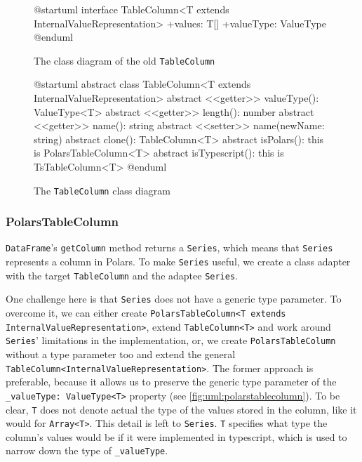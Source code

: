 \begin{figure}
	\begin{plantuml}
		@startuml
		interface TableColumn<T extends InternalValueRepresentation>{
				+values: T[]
				+valueType: ValueType
			}
		@enduml
	\end{plantuml}
	\caption{The class diagram of the old \Verb|TableColumn|}
	\label{fig:uml:old_tablecolumn}
\end{figure}

\begin{figure}
	\begin{plantuml}
		@startuml
		abstract class TableColumn<T extends InternalValueRepresentation> {
				{abstract} <<getter>> valueType(): ValueType<T>
					{abstract} <<getter>> length(): number
					{abstract} <<getter>> name(): string
					{abstract} <<setter>> name(newName: string)
				{abstract} clone(): TableColumn<T>
					{abstract} isPolars(): this is PolarsTableColumn<T>
					{abstract} isTypescript(): this is TsTableColumn<T>
			}
		@enduml
	\end{plantuml}
	\caption{The \Verb|TableColumn| class diagram}
	\label{fig:uml:tablecolumn}
\end{figure}

\subsubsection{PolarsTableColumn}
\label{subsubsection:polarstablecolumn}
\Verb|DataFrame|'s \Verb|getColumn| method returns a \Verb|Series|, which means that \Verb|Series| represents a column in Polars.
To make \Verb|Series| useful, we create a class adapter with the target \Verb|TableColumn| and the adaptee \Verb|Series|.

One challenge here is that \Verb|Series| does not have a generic type parameter.
To overcome it, we can either create \Verb|PolarsTableColumn<T extends InternalValueRepresentation>|, extend \Verb|TableColumn<T>| and work around \Verb|Series|' limitations in the implementation, or, we create \Verb|PolarsTableColumn| without a type parameter too and extend the general \Verb|TableColumn<InternalValueRepresentation>|.
The former approach is preferable, because it allows us to preserve the generic type parameter of the \Verb|_valueType: ValueType<T>| property (see \ref{fig:uml:polarstablecolumn}).
To be clear, \Verb|T| does not denote actual the type of the values stored in the column, like it would for \Verb|Array<T>|.
This detail is left to \Verb|Series|.
\Verb|T| specifies what type the column's values would be if it were implemented in typescript, which is used to narrow down the type of \Verb|_valueType|.

